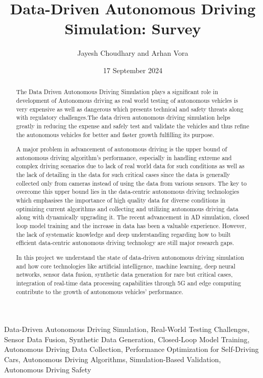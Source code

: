 \documentclass[lettersize,journal]{IEEEtran}
\begin{document}
\title{Data-Driven Autonomous Driving Simulation: Survey}
\author{Jayesh Choudhary and Arhan Vora}
\date{17 September 2024}

\maketitle

\begin{abstract}
The Data Driven Autonomous Driving Simulation plays a significant role in development of Autonomous driving as real world testing of autonomous vehicles is very expensive as well as dangerous which presents technical and safety threats along with regulatory challenges.The data driven autonomous driving simulation helps greatly in reducing the expense and safely test and validate the vehicles and thus refine the autonomous vehicles for better and faster growth fulfilling its purpose. 

A major problem in advancement of autonomous driving is the upper bound of autonomous driving algorithm's performance, especially in handling extreme and complex driving scenarios due to lack of real world data for such conditions as well as the lack of detailing in the data for such critical cases since the data is generally collected only from cameras instead of using the data from various sensors. The key to overcome this upper bound lies in the data-centric autonomous driving technologies which emphasises the importance of high quality data for diverse conditions in optimizing current algorithms and collecting and utilizing autonomous driving data along with dynamically upgrading it.
The recent advancement in AD simulation, closed loop model training and the increase in data has been a valuable experience. However, the lack of systematic knowledge and deep understanding regarding how to built efficient data-centric autonomous driving technology are still major research gaps.

In this project we understand the state of data-driven autonomous driving simulation and how core technologies like artificial intelligence, machine learning, deep neural networks, sensor data fusion, synthetic data generation for rare but critical cases, integration of real-time data processing capabilities through 5G and edge computing contribute to the growth of autonomous vehicles' performance.

\end{abstract}

\begin{IEEEkeywords}
Data-Driven Autonomous Driving Simulation, Real-World Testing Challenges, Sensor Data Fusion, Synthetic Data Generation, Closed-Loop Model Training, Autonomous Driving Data Collection, Performance Optimization for Self-Driving Cars, Autonomous Driving Algorithms, Simulation-Based Validation, Autonomous Driving Safety
\end{IEEEkeywords}
\end{document}
